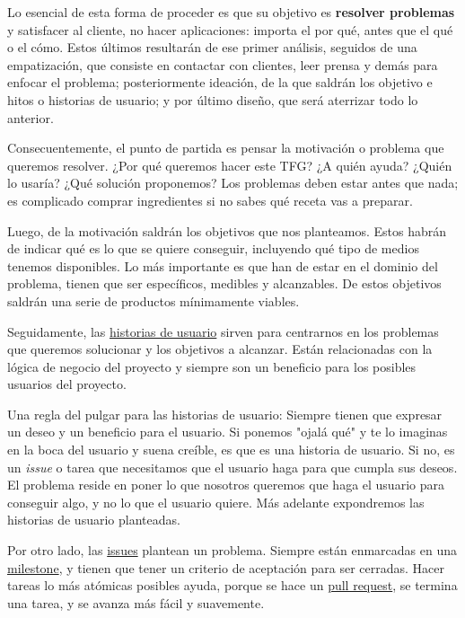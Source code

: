 Lo esencial de esta forma de proceder es que su objetivo es \textbf{resolver problemas} y satisfacer 
al cliente, no hacer aplicaciones: importa el por qué, antes que el qué o el cómo. Estos 
últimos resultarán de ese primer análisis, seguidos de una empatización, que consiste 
en contactar con clientes, leer prensa y demás para enfocar el problema; posteriormente 
ideación, de la que saldrán los objetivo e hitos o historias de usuario; y por último diseño, 
que será aterrizar todo lo anterior. 

Consecuentemente, el punto de partida es pensar la motivación o problema que queremos resolver. 
¿Por qué queremos hacer este TFG? ¿A quién ayuda? ¿Quién lo usaría? ¿Qué solución proponemos? 
Los problemas deben estar antes que nada; es complicado comprar ingredientes si no sabes qué 
receta vas a preparar. 

Luego, de la motivación saldrán los objetivos que nos planteamos. Estos habrán de indicar 
qué es lo que se quiere conseguir, incluyendo qué tipo de medios tenemos disponibles. Lo 
más importante es que han de estar en el dominio del problema, tienen que ser específicos, 
medibles y alcanzables\cite{objetivos}. De estos objetivos saldrán una serie de productos 
mínimamente viables. 

Seguidamente, las \href{https://jj.github.io/curso-tdd/temas/dise%C3%B1o.html}{historias de usuario} sirven 
para centrarnos en los problemas que queremos solucionar 
y los objetivos a alcanzar. Están relacionadas con la lógica de 
negocio del proyecto y siempre son un beneficio para los posibles usuarios del proyecto.

Una regla del pulgar para las historias de usuario: Siempre tienen que expresar un deseo y un 
beneficio para el usuario. Si ponemos "ojalá qué" y te lo imaginas en la boca del usuario y suena 
creíble, es que es una historia de usuario. Si no, es un \textit{issue} o tarea que necesitamos
que el usuario haga para que cumpla sus deseos. El problema reside en poner lo que nosotros queremos que 
haga el usuario para conseguir algo, y no lo que el usuario quiere. Más adelante expondremos las historias 
de usuario planteadas.

Por otro lado, las \href{https://docs.github.com/articles/about-issues}{issues} plantean un problema. 
Siempre están enmarcadas en una \href{https://docs.github.com/en/issues/using-labels-and-milestones-to-track-work/about-milestones}{milestone}, 
y tienen que tener un criterio de aceptación para ser cerradas. Hacer tareas lo más atómicas posibles ayuda, porque 
se hace un \href{https://docs.github.com/en/pull-requests/collaborating-with-pull-requests/proposing-changes-to-your-work-with-pull-requests/about-pull-requests}{pull request}, 
se termina una tarea, y se avanza más fácil y suavemente.

